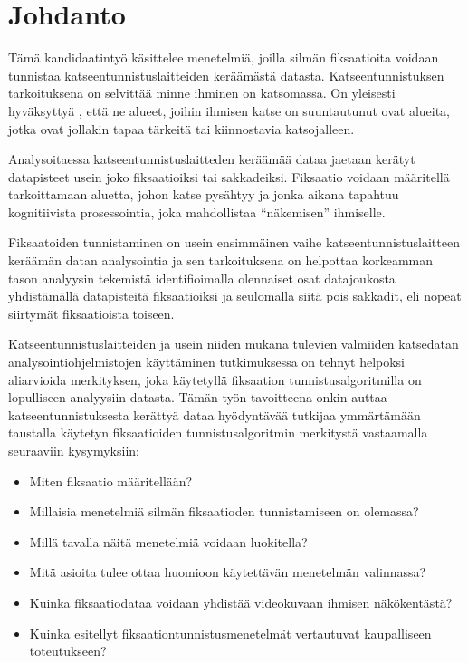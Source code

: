 \section{Johdanto}

Tämä kandidaatintyö käsittelee menetelmiä, joilla silmän fiksaatioita
voidaan tunnistaa katseentunnistuslaitteiden keräämästä datasta. Katseentunnistuksen tarkoituksena on selvittää minne ihminen on katsomassa. On yleisesti hyväksyttyä \citep[s.33]{munn2008}, että ne alueet, joihin ihmisen katse on suuntautunut ovat alueita, jotka ovat jollakin tapaa tärkeitä tai kiinnostavia katsojalleen. 

Analysoitaessa katseentunnistuslaitteden keräämää dataa jaetaan kerätyt datapisteet usein joko fiksaatioiksi tai sakkadeiksi. \citep[s. 71]{salvucci2000} Fiksaatio voidaan määritellä tarkoittamaan aluetta, johon katse pysähtyy \citep[s. 71]{salvucci2000} ja jonka aikana tapahtuu kognitiivista prosessointia, joka mahdollistaa ``näkemisen''  ihmiselle. \citep[s. 881]{Blignaut2009}

Fiksaatoiden tunnistaminen on usein ensimmäinen vaihe katseentunnistuslaitteen keräämän datan analysointia ja sen tarkoituksena on helpottaa korkeamman tason analyysin tekemistä identifioimalla olennaiset osat datajoukosta yhdistämällä datapisteitä fiksaatioiksi ja seulomalla siitä pois sakkadit, eli nopeat siirtymät fiksaatioista toiseen. \citep[s. 18]{mould2012}

Katseentunnistuslaitteiden ja usein niiden mukana tulevien valmiiden katsedatan analysointiohjelmistojen käyttäminen tutkimuksessa on tehnyt helpoksi aliarvioida merkityksen, joka käytetyllä fiksaation tunnistusalgoritmilla on lopulliseen analyysiin datasta. \citep[s. 111]{shic2008}
Tämän työn tavoitteena onkin auttaa katseentunnistuksesta kerättyä dataa hyödyntävää tutkijaa ymmärtämään taustalla käytetyn fiksaatioiden tunnistusalgoritmin merkitystä vastaamalla seuraaviin kysymyksiin:
\begin{itemize}
	\item Miten fiksaatio määritellään?
	\item Millaisia menetelmiä silmän fiksaatioden tunnistamiseen on olemassa?
	\item Millä tavalla näitä menetelmiä voidaan luokitella?
	\item Mitä asioita tulee ottaa huomioon käytettävän menetelmän valinnassa?
	\item Kuinka fiksaatiodataa voidaan yhdistää videokuvaan ihmisen näkökentästä?
	\item Kuinka esitellyt fiksaationtunnistusmenetelmät vertautuvat kaupalliseen toteutukseen?
\end{itemize}


